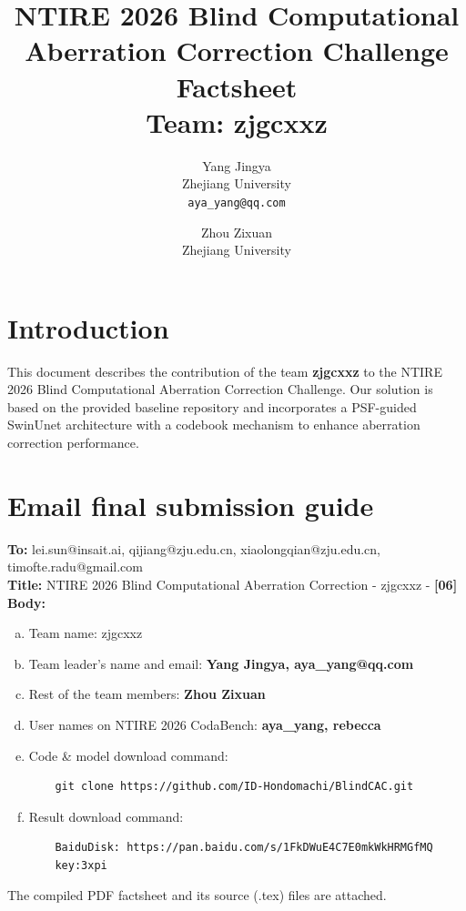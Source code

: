 \documentclass[10pt,twocolumn,letterpaper]{article}
\begin{document}
\title{NTIRE 2026 Blind Computational Aberration Correction Challenge Factsheet\\Team: zjgcxxz}

\author{
Yang Jingya\\
Zhejiang University\\
\texttt{aya\_yang@qq.com}
\and
Zhou Zixuan\\
Zhejiang University
}
\maketitle

\section{Introduction}
This document describes the contribution of the team \textbf{zjgcxxz} to the NTIRE 2026 Blind Computational Aberration Correction Challenge. Our solution is based on the provided baseline repository and incorporates a PSF-guided SwinUnet architecture with a codebook mechanism to enhance aberration correction performance.

\section{Email final submission guide}
\textbf{To:} lei.sun@insait.ai, qijiang@zju.edu.cn, xiaolongqian@zju.edu.cn, timofte.radu@gmail.com \\
\textbf{Title:} NTIRE 2026 Blind Computational Aberration Correction - zjgcxxz - \textbf{[06]} \\
\textbf{Body:}
\begin{enumerate}[a)]
    \item Team name: zjgcxxz
    \item Team leader's name and email: \textbf{Yang Jingya, aya\_yang@qq.com}
    \item Rest of the team members: \textbf{Zhou Zixuan}
    \item User names on NTIRE 2026 CodaBench: \textbf{aya\_yang, rebecca}
    \item Code \& model download command: 
    \begin{verbatim}
    git clone https://github.com/ID-Hondomachi/BlindCAC.git
    \end{verbatim}
    \item Result download command: 
    \begin{verbatim}
    BaiduDisk: https://pan.baidu.com/s/1FkDWuE4C7E0mkWkHRMGfMQ
    key:3xpi
    \end{verbatim}
\end{enumerate}
The compiled PDF factsheet and its source (.tex) files are attached.
\end{document}
